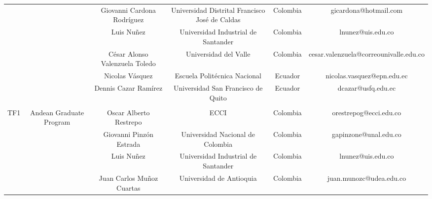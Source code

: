 \begin{table}[H]
{\begin{tabular}{cccccc}
\multicolumn{1}{c|}{} & \multicolumn{1}{c|}{} & \multicolumn{1}{c|}{Giovanni Cardona Rodríguez} & \multicolumn{1}{c|}{Universidad Distrital Francisco José de Caldas} & \multicolumn{1}{c|}{Colombia} & \multicolumn{1}{c|}{gicardona@hotmail.com} \\ \cline{3-6} 
\multicolumn{1}{c|}{} & \multicolumn{1}{c|}{} & \multicolumn{1}{c|}{Luis Nuñez} & \multicolumn{1}{c|}{Universidad Industrial de Santander} & \multicolumn{1}{c|}{Colombia} & \multicolumn{1}{c|}{lnunez@uis.edu.co} \\ \cline{3-6} 
\multicolumn{1}{c|}{} & \multicolumn{1}{c|}{} & \multicolumn{1}{c|}{César Alonso Valenzuela Toledo} & \multicolumn{1}{c|}{Universidad del Valle} & \multicolumn{1}{c|}{Colombia} & \multicolumn{1}{c|}{cesar.valenzuela@correounivalle.edu.co} \\ \cline{3-6} 
\multicolumn{1}{c|}{} & \multicolumn{1}{c|}{} & \multicolumn{1}{c|}{Nicolas Vásquez} & \multicolumn{1}{c|}{Escuela Politécnica Nacional} & \multicolumn{1}{c|}{Ecuador} & \multicolumn{1}{c|}{nicolas.vasquez@epn.edu.ec} \\ \cline{3-6} 
\multicolumn{1}{c|}{} & \multicolumn{1}{c|}{} & \multicolumn{1}{c|}{Dennis Cazar Ramírez} & \multicolumn{1}{c|}{Universidad San Francisco de Quito} & \multicolumn{1}{c|}{Ecuador} & \multicolumn{1}{c|}{dcazar@usfq.edu.ec} \\ \cline{2-6} 
 &  &  &  &  &  \\ \hline
\multicolumn{1}{|c|}{TF1} & \multicolumn{1}{c|}{\multirow{9}{*}{Andean Graduate Program}} & \multicolumn{1}{c|}{Oscar Alberto Restrepo} & \multicolumn{1}{c|}{ECCI} & \multicolumn{1}{c|}{Colombia} & \multicolumn{1}{c|}{orestrepog@ecci.edu.co} \\ \cline{1-1} \cline{3-6} 
\multicolumn{1}{c|}{} & \multicolumn{1}{c|}{} & \multicolumn{1}{c|}{Giovanni Pinzón Estrada} & \multicolumn{1}{c|}{Universidad Nacional de Colombia} & \multicolumn{1}{c|}{Colombia} & \multicolumn{1}{c|}{gapinzone@unal.edu.co} \\ \cline{3-6} 
\multicolumn{1}{c|}{} & \multicolumn{1}{c|}{} & \multicolumn{1}{c|}{Luis Nuñez} & \multicolumn{1}{c|}{Universidad Industrial de Santander} & \multicolumn{1}{c|}{Colombia} & \multicolumn{1}{c|}{lnunez@uis.edu.co} \\ \cline{3-6} 
\multicolumn{1}{c|}{} & \multicolumn{1}{c|}{} & \multicolumn{1}{c|}{Juan Carlos Muñoz Cuartas} & \multicolumn{1}{c|}{Universidad de Antioquia} & \multicolumn{1}{c|}{Colombia} & \multicolumn{1}{c|}{juan.munozc@udea.edu.co} \\ \cline{3-6} 

\end{tabular}}
\end{table}
